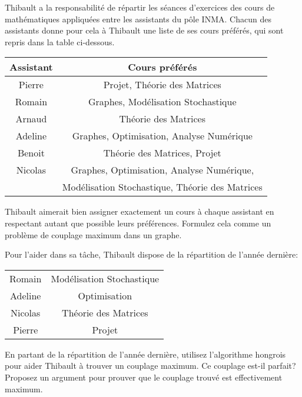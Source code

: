 Thibault a la responsabilité de répartir les séances d'exercices des cours de mathématiques appliquées entre les assistants du pôle INMA. Chacun des assistants donne pour cela à Thibault une liste de ses cours préférés, qui sont repris dans la table ci-dessous.

\begin{center}
  \begin{tabular}{|c|c|}
    \hline
    Assistant & Cours préférés \\
    \hline
    Pierre & Projet, Théorie des Matrices \\
    Romain & Graphes, Modélisation Stochastique \\
    Arnaud & Théorie des Matrices \\
    Adeline & Graphes, Optimisation, Analyse Numérique \\
    Benoit & Théorie des Matrices, Projet \\
    Nicolas & Graphes, Optimisation, Analyse Numérique, \\
            & Modélisation Stochastique, Théorie des Matrices  \\
    \hline
  \end{tabular}
\end{center}

Thibault aimerait bien assigner exactement un cours à chaque assistant en respectant autant que possible leurs préférences. Formulez cela comme un problème de couplage maximum dans un graphe.

Pour l'aider dans sa tâche, Thibault dispose de la répartition de l'année dernière:

\begin{center}
  \begin{tabular}{|c|c|}
    \hline
    Romain & Modélisation Stochastique \\
    Adeline & Optimisation \\
    Nicolas & Théorie des Matrices \\
    Pierre & Projet \\
    \hline
  \end{tabular}
\end{center}

En partant de la répartition de l'année dernière, utilisez l'algorithme hongrois pour aider Thibault à trouver un couplage maximum. Ce couplage est-il parfait? Proposez un argument pour prouver que le couplage trouvé est effectivement maximum.




